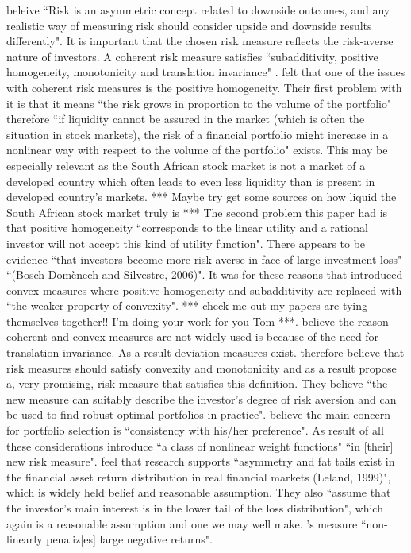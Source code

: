 \documentclass[12pt,a4paper]{article}
\begin{document}
\cite{CHEN20111777} beleive ``Risk is an asymmetric concept related to downside outcomes, and any realistic way of measuring risk should consider upside and downside results differently". It is important that the chosen risk measure reflects the risk-averse nature of investors. A coherent risk measure satisfies ``subadditivity, positive homogeneity,
monotonicity and translation invariance" \citep{CHEN20111777}. \cite{CHEN20111777} felt that one of the issues with coherent risk measures is the positive homogeneity. Their first problem with it is that it means ``the risk grows in proportion to the volume of the portfolio" therefore ``if liquidity cannot be assured in the market (which is often the situation in stock markets), the risk of a financial portfolio might increase in a nonlinear way with respect to the volume of the portfolio" exists. This may be especially relevant as the South African stock market is not a market of a developed country which often leads to even less liquidity than is present in developed country's markets. *** Maybe try get some sources on how liquid the South African stock market truly is *** The second problem this paper had is that positive homogeneity ``corresponds to the linear utility and a rational investor will not accept this kind of utility function". There appears to be evidence ``that investors become more risk averse in face of large investment loss" ``(Bosch-Domènech and Silvestre, 2006)". It was for these reasons that \cite{Föllmer2002} introduced convex measures where positive homogeneity and subadditivity are replaced with ``the weaker property of convexity". *** check me out my papers are tying themselves together!! I'm doing your work for you Tom ***. \cite{CHEN20111777} believe the reason coherent and convex measures are not widely used is because of the need for translation invariance. As a result deviation measures exist.  \cite{CHEN20111777} therefore believe that risk measures should satisfy convexity and monotonicity and as a result propose a, very promising, risk measure that satisfies this definition. They believe ``the new measure can suitably describe the
investor’s degree of risk aversion and can be used to find robust optimal portfolios in practice". \cite{CHEN20111777} believe the main concern for portfolio selection is ``consistency with his/her preference". As result of all these considerations \cite{CHEN20111777} introduce ``a class of nonlinear weight functions" ``in [their] new risk measure".  \cite{CHEN20111777} feel that research supports ``asymmetry and fat tails exist in the financial asset return distribution in real financial markets (Leland, 1999)", which is widely held belief and reasonable assumption. They also ``assume that the investor’s main interest is in the lower tail of the loss distribution", which again is a reasonable assumption and one we may well make. \cite{CHEN20111777}'s measure ``non-linearly penaliz[es] large negative returns". 
\end{document}
